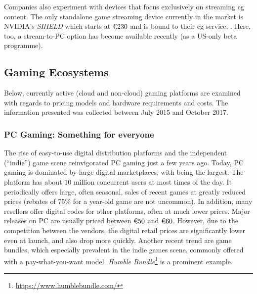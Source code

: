 Companies also experiment with devices that focus exclusively on streaming
\gls{cg} content. The only standalone game streaming device currently
in the market is NVIDIA's \textit{SHIELD} which starts at
$\text{\texteuro} 230$ and is bound to their \gls{cg} service, \gfnow.
Here, too, a stream-to-\gls{PC} option has become available recently
(as a US-only beta programme).



\subsection{Gaming Ecosystems}
Below, currently active (cloud and non-cloud) gaming platforms are examined
with regards to pricing models and hardware requirements and costs. The
information presented was collected between July 2015 and October 2017.

\subsubsection{\gls{PC} Gaming: Something for everyone}
\label{sec:pcgaming}

The rise of easy-to-use digital distribution platforms and the
independent (``indie'') game scene reinvigorated \gls{PC} gaming just a few
years ago. Today, \gls{PC} gaming is dominated by large digital marketplaces,
with \steam being the largest. The platform has about $10$ million
concurrent users at most times of the day. It periodically offers large,
often seasonal, sales of recent games at greatly reduced prices (rebates
of 75\% for a year-old game are not uncommon). In addition, many
resellers offer digital codes for other platforms, often at much lower
prices.
Major releases on PC are usually priced between $\text{\texteuro} 50$
and $\text{\texteuro} 60$. However, due to the competition between the
vendors, the digital retail prices are significantly lower even at
launch, and also drop more quickly. Another recent trend are game
bundles, which especially prevalent in the indie games scene, commonly
offered with a pay-what-you-want model. \textit{Humble
Bundle}\footnote{\url{https://www.humblebundle.com/}} is a prominent
example.


